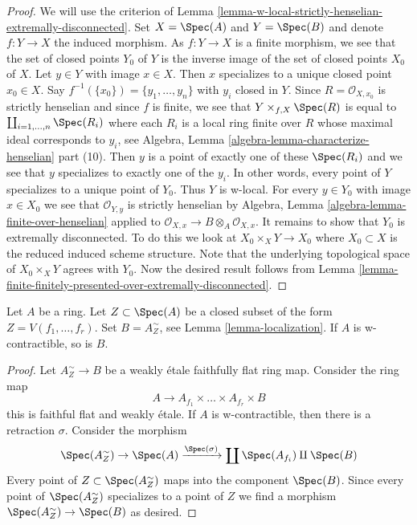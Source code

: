 \begin{proof}
We will use the criterion of
Lemma \ref{lemma-w-local-strictly-henselian-extremally-disconnected}.
Set $X = \Spec(A)$ and $Y = \Spec(B)$ and denote $f : Y \to X$
the induced morphism.
As $f : Y \to X$ is a finite morphism, we see that the set of closed
points $Y_0$ of $Y$ is the inverse image of the set of closed points
$X_0$ of $X$. Let $y \in Y$ with image $x \in X$. Then
$x$ specializes to a unique closed point $x_0 \in X$.
Say $f^{-1}(\{x_0\}) = \{y_1, \ldots, y_n\}$ with $y_i$
closed in $Y$. Since $R = \mathcal{O}_{X, x_0}$ is strictly henselian
and since $f$ is finite, we see that $Y \times_{f, X} \Spec(R)$ is
equal to $\coprod_{i = 1, \ldots, n} \Spec(R_i)$ where
each $R_i$ is a local ring finite over $R$
whose maximal ideal corresponds to $y_i$, see
Algebra, Lemma \ref{algebra-lemma-characterize-henselian} part (10).
Then $y$ is a point of exactly one of these $\Spec(R_i)$
and we see that $y$ specializes to exactly one of the $y_i$.
In other words, every point of $Y$ specializes to a unique
point of $Y_0$. Thus $Y$ is w-local.
For every $y \in Y_0$ with image $x \in X_0$
we see that $\mathcal{O}_{Y, y}$ is strictly henselian by
Algebra, Lemma \ref{algebra-lemma-finite-over-henselian}
applied to $\mathcal{O}_{X, x} \to B \otimes_A \mathcal{O}_{X, x}$.
It remains to show that $Y_0$ is extremally disconnected.
To do this we look at $X_0 \times_X Y \to X_0$
where $X_0 \subset X$ is the reduced induced scheme structure.
Note that the underlying topological space of
$X_0 \times_X Y$ agrees with $Y_0$. Now the desired result follows from
Lemma \ref{lemma-finite-finitely-presented-over-extremally-disconnected}.
\end{proof}

\begin{lemma}
\label{lemma-localization-w-contractible}
Let $A$ be a ring. Let $Z \subset \Spec(A)$ be a closed subset
of the form $Z = V(f_1, \ldots, f_r)$. Set $B = A_Z^\sim$, see
Lemma \ref{lemma-localization}. If $A$ is w-contractible, so is $B$.
\end{lemma}

\begin{proof}
Let $A_Z^\sim \to B$ be a weakly \'etale faithfully flat ring map.
Consider the ring map
$$
A \longrightarrow A_{f_1} \times \ldots \times A_{f_r} \times B
$$
this is faithful flat and weakly \'etale. If $A$ is w-contractible,
then there is a retraction $\sigma$. Consider the morphism
$$
\Spec(A_Z^\sim) \to \Spec(A) \xrightarrow{\Spec(\sigma)}
\coprod \Spec(A_{f_i}) \amalg \Spec(B)
$$
Every point of $Z \subset \Spec(A_Z^\sim)$ maps into the component
$\Spec(B)$. Since every point of $\Spec(A_Z^\sim)$ specializes to a
point of $Z$ we find a morphism $\Spec(A_Z^\sim) \to \Spec(B)$
as desired.
\end{proof}






